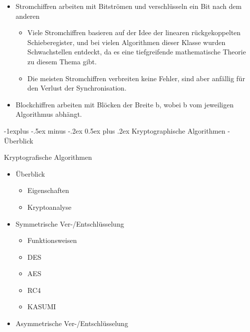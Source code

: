 \documentclass[a4paper]{article}
\makeatletter
\renewcommand{\subsection}{\@startsection{subsection}{2}{0mm}%
 {-1explus -.5ex minus -.2ex}%
 {0.5ex plus .2ex}%
 {\normalfont\normalsize\bfseries}}
\makeatother
\begin{document}
\begin{multicols}{3}
\begin{itemize}
              \begin{itemize}
                  \item
                        Stromchiffren arbeiten mit Bitströmen und verschlüsseln ein Bit nach
                        dem anderen

                        \begin{itemize}
                            \item
                                  Viele Stromchiffren basieren auf der Idee der linearen
                                  rückgekoppelten Schieberegister, und bei vielen Algorithmen dieser
                                  Klasse wurden Schwachstellen entdeckt, da es eine tiefgreifende
                                  mathematische Theorie zu diesem Thema gibt.
                            \item
                                  Die meisten Stromchiffren verbreiten keine Fehler, sind aber
                                  anfällig für den Verlust der Synchronisation.
                        \end{itemize}
                  \item
                        Blockchiffren arbeiten mit Blöcken der Breite b, wobei b vom
                        jeweiligen Algorithmus abhängt.
              \end{itemize}
    \end{itemize}


    \subsection{Kryptographische Algorithmen -
        Überblick}

    Kryptografische Algorithmen

    \begin{itemize}
        \item
              Überblick

              \begin{itemize}
                  \item
                        Eigenschaften
                  \item
                        Kryptoanalyse
              \end{itemize}
        \item
              Symmetrische Ver-/Entschlüsselung

              \begin{itemize}
                  \item
                        Funktionsweisen
                  \item
                        DES
                  \item
                        AES
                  \item
                        RC4
                  \item
                        KASUMI
              \end{itemize}
        \item
              Asymmetrische Ver-/Entschlüsselung


\end{itemize}
\end{multicols}
\end{document}
